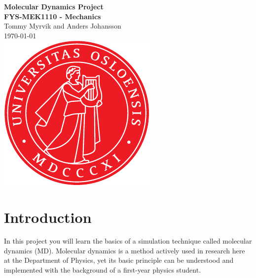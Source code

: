 \documentclass[11pt,british,a4paper]{report}
\begin{document}

\begin{titlepage}
\vspace*{\fill}
\begin{center}
\textsf{
    \Huge \textbf{Molecular Dynamics Project}\\\vspace{0.5cm}
    \Large \textbf{FYS-MEK1110 - Mechanics}\\
    \vspace{8cm}
    Tommy Myrvik and Anders Johansson\\
    \today\\
}
\vspace{1.5cm}
\includegraphics{uio.pdf}\\
\vspace*{\fill}
\end{center}
\end{titlepage}
\null
\pagestyle{empty}
\newpage

\pagestyle{fancy}
\setcounter{page}{1}


\section{Introduction}
In this project you will learn the basics of a simulation technique called molecular dynamics (MD). Molecular dynamics is a method actively used in research here at the Department of Physics, yet its basic principle can be understood and implemented with the background of a first-year physics student.
\end{document}
